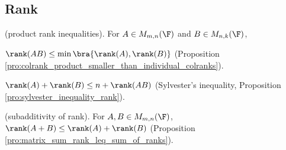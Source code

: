 \subsection{Rank}

(product rank inequalities). For $A\in M_{m,n}(\F)$ and $B\in M_{n,k}(\F)$,
\ben
\item [(i)] $\rank(AB) \leq \min\bra{\rank(A), \rank(B)}$ (Proposition \ref{pro:colrank_product_smaller_than_individual_colranks}).
\item [(ii)] $\rank(A) + \rank(B) \leq n + \rank(AB)$ (Sylvester's inequality, Proposition \ref{pro:sylvester_inequality_rank}).
\een





(subadditivity of rank). For $A,B\in M_{m,n}(\F)$, $\rank(A+B) \leq \rank(A) + \rank(B)$ (Proposition \ref{pro:matrix_sum_rank_leq_sum_of_ranks}).


